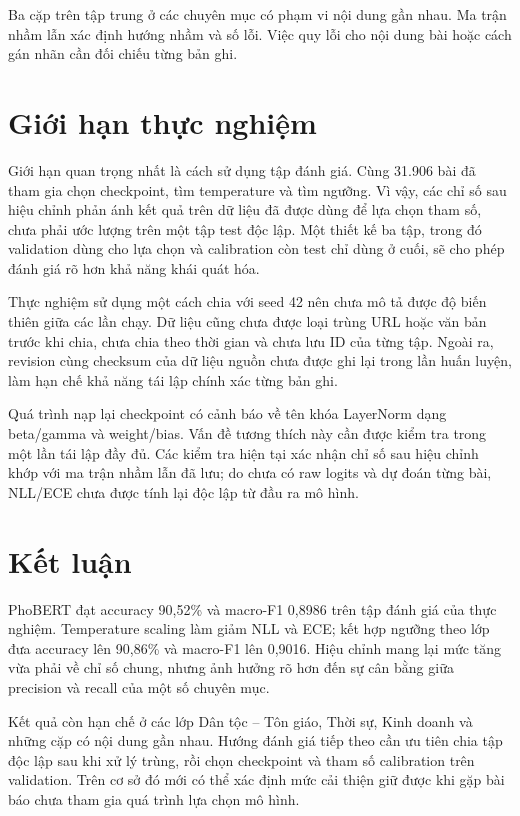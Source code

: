 Ba cặp trên tập trung ở các chuyên mục có phạm vi nội dung gần nhau. Ma trận nhầm lẫn xác định hướng nhầm và số lỗi. Việc quy lỗi cho nội dung bài hoặc cách gán nhãn cần đối chiếu từng bản ghi.

\section{Giới hạn thực nghiệm}
Giới hạn quan trọng nhất là cách sử dụng tập đánh giá. Cùng 31.906 bài đã tham gia chọn checkpoint, tìm temperature và tìm ngưỡng. Vì vậy, các chỉ số sau hiệu chỉnh phản ánh kết quả trên dữ liệu đã được dùng để lựa chọn tham số, chưa phải ước lượng trên một tập test độc lập. Một thiết kế ba tập, trong đó validation dùng cho lựa chọn và calibration còn test chỉ dùng ở cuối, sẽ cho phép đánh giá rõ hơn khả năng khái quát hóa.

Thực nghiệm sử dụng một cách chia với seed 42 nên chưa mô tả được độ biến thiên giữa các lần chạy. Dữ liệu cũng chưa được loại trùng URL hoặc văn bản trước khi chia, chưa chia theo thời gian và chưa lưu ID của từng tập. Ngoài ra, revision cùng checksum của dữ liệu nguồn chưa được ghi lại trong lần huấn luyện, làm hạn chế khả năng tái lập chính xác từng bản ghi.

Quá trình nạp lại checkpoint có cảnh báo về tên khóa LayerNorm dạng beta/gamma và weight/bias. Vấn đề tương thích này cần được kiểm tra trong một lần tái lập đầy đủ. Các kiểm tra hiện tại xác nhận chỉ số sau hiệu chỉnh khớp với ma trận nhầm lẫn đã lưu; do chưa có raw logits và dự đoán từng bài, NLL/ECE chưa được tính lại độc lập từ đầu ra mô hình.

\section{Kết luận}
PhoBERT đạt accuracy 90,52\% và macro-F1 0,8986 trên tập đánh giá của thực nghiệm. Temperature scaling làm giảm NLL và ECE; kết hợp ngưỡng theo lớp đưa accuracy lên 90,86\% và macro-F1 lên 0,9016. Hiệu chỉnh mang lại mức tăng vừa phải về chỉ số chung, nhưng ảnh hưởng rõ hơn đến sự cân bằng giữa precision và recall của một số chuyên mục.

Kết quả còn hạn chế ở các lớp Dân tộc -- Tôn giáo, Thời sự, Kinh doanh và những cặp có nội dung gần nhau. Hướng đánh giá tiếp theo cần ưu tiên chia tập độc lập sau khi xử lý trùng, rồi chọn checkpoint và tham số calibration trên validation. Trên cơ sở đó mới có thể xác định mức cải thiện giữ được khi gặp bài báo chưa tham gia quá trình lựa chọn mô hình.


